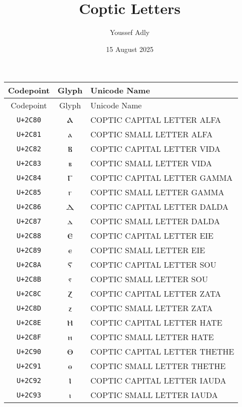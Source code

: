 \documentclass[10pt,a4paper]{article}
\title{Coptic Letters}
\author{Youssef Adly}
\date{15 August 2025}
\newcommand{\coptic}[1]{{\copticfont #1}}
\begin{document}
\maketitle


\begin{longtable}{C C L}
\toprule
Codepoint & Glyph & Unicode Name \\
\midrule
\endfirsthead

\toprule
Codepoint & Glyph & Unicode Name \\
\midrule
\endhead

\texttt{U+2C80} & \coptic{Ⲁ} & COPTIC CAPITAL LETTER ALFA \\
\texttt{U+2C81} & \coptic{ⲁ} & COPTIC SMALL LETTER ALFA \\
\texttt{U+2C82} & \coptic{Ⲃ} & COPTIC CAPITAL LETTER VIDA \\
\texttt{U+2C83} & \coptic{ⲃ} & COPTIC SMALL LETTER VIDA \\
\texttt{U+2C84} & \coptic{Ⲅ} & COPTIC CAPITAL LETTER GAMMA \\
\texttt{U+2C85} & \coptic{ⲅ} & COPTIC SMALL LETTER GAMMA \\
\texttt{U+2C86} & \coptic{Ⲇ} & COPTIC CAPITAL LETTER DALDA \\
\texttt{U+2C87} & \coptic{ⲇ} & COPTIC SMALL LETTER DALDA \\
\texttt{U+2C88} & \coptic{Ⲉ} & COPTIC CAPITAL LETTER EIE \\
\texttt{U+2C89} & \coptic{ⲉ} & COPTIC SMALL LETTER EIE \\
\texttt{U+2C8A} & \coptic{Ⲋ} & COPTIC CAPITAL LETTER SOU \\
\texttt{U+2C8B} & \coptic{ⲋ} & COPTIC SMALL LETTER SOU \\
\texttt{U+2C8C} & \coptic{Ⲍ} & COPTIC CAPITAL LETTER ZATA \\
\texttt{U+2C8D} & \coptic{ⲍ} & COPTIC SMALL LETTER ZATA \\
\texttt{U+2C8E} & \coptic{Ⲏ} & COPTIC CAPITAL LETTER HATE \\
\texttt{U+2C8F} & \coptic{ⲏ} & COPTIC SMALL LETTER HATE \\
\texttt{U+2C90} & \coptic{Ⲑ} & COPTIC CAPITAL LETTER THETHE \\
\texttt{U+2C91} & \coptic{ⲑ} & COPTIC SMALL LETTER THETHE \\
\texttt{U+2C92} & \coptic{Ⲓ} & COPTIC CAPITAL LETTER IAUDA \\
\texttt{U+2C93} & \coptic{ⲓ} & COPTIC SMALL LETTER IAUDA \\

\end{longtable}
\end{document}
